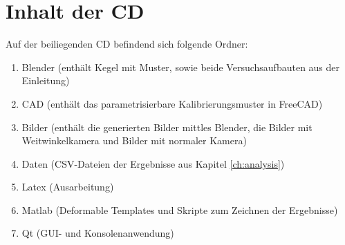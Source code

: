 \chapter{Inhalt der CD}
\label{ch:cdContent}

Auf der beiliegenden CD befindend sich folgende Ordner:
\begin{enumerate}
	\item Blender (enthält Kegel mit Muster, sowie beide Versuchsaufbauten aus der Einleitung)
	\item CAD (enthält das parametrisierbare Kalibrierungsmuster in FreeCAD)
	\item Bilder (enthält die generierten Bilder mittles Blender, die Bilder mit Weitwinkelkamera und Bilder mit normaler Kamera)
	\item Daten (CSV-Dateien der Ergebnisse aus Kapitel \ref{ch:analysis})
	\item Latex (Ausarbeitung)
	\item Matlab (Deformable Templates und Skripte zum Zeichnen der Ergebnisse)
	\item Qt (GUI- und Konsolenanwendung)

\end{enumerate}
